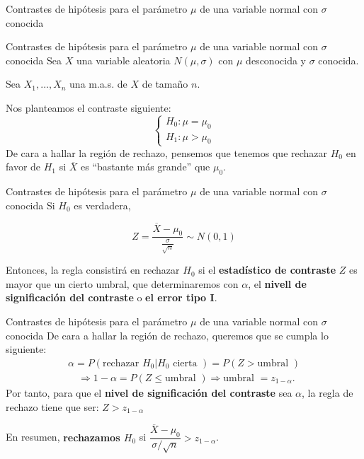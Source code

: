 \documentclass[
  ignorenonframetext,
]{beamer}
\begin{document}
\begin{frame}{Contrastes de hipótesis para el parámetro \(\mu\) de una
variable normal con \(\sigma\) conocida}
\protect\hypertarget{contrastes-de-hipuxf3tesis-para-el-paruxe1metro-mu-de-una-variable-normal-con-sigma-conocida}{}
\end{frame}

\begin{frame}{Contrastes de hipótesis para el parámetro \(\mu\) de una
variable normal con \(\sigma\) conocida}
\protect\hypertarget{contrastes-de-hipuxf3tesis-para-el-paruxe1metro-mu-de-una-variable-normal-con-sigma-conocida-1}{}
Sea \(X\) una variable aleatoria \(N(\mu,\sigma)\) con \(\mu\)
desconocida y \(\sigma\) conocida.

Sea \(X_{1},\ldots,X_{n}\) una m.a.s. de \(X\) de tamaño \(n\).

Nos planteamos el contraste siguiente: \[
\left\{\begin{array}{l}
H_{0}:\mu=\mu_{0}\\ H_{1}:\mu >\mu_0
\end{array}
\right.
\] De cara a hallar la región de rechazo, pensemos que tenemos que
rechazar \(H_0\) en favor de \(H_1\) si \(\overline{X}\) es ``bastante
más grande'' que \(\mu_0\).
\end{frame}

\begin{frame}{Contrastes de hipótesis para el parámetro \(\mu\) de una
variable normal con \(\sigma\) conocida}
\protect\hypertarget{contrastes-de-hipuxf3tesis-para-el-paruxe1metro-mu-de-una-variable-normal-con-sigma-conocida-2}{}
Si \(H_0\) es verdadera,

\[
Z=\frac{\overline{X}-\mu_{0}}{\frac{\sigma}{\sqrt{n}}}\sim N(0,1)
\]

Entonces, la regla consistirá en rechazar \(H_{0}\) si el
\textbf{estadístico de contraste} \(Z\) es mayor que un cierto umbral,
que determinaremos con \(\alpha\), el \textbf{nivell de significación
del contraste} o \textbf{el error tipo I}.
\end{frame}

\begin{frame}{Contrastes de hipótesis para el parámetro \(\mu\) de una
variable normal con \(\sigma\) conocida}
\protect\hypertarget{contrastes-de-hipuxf3tesis-para-el-paruxe1metro-mu-de-una-variable-normal-con-sigma-conocida-3}{}
De cara a hallar la región de rechazo, queremos que se cumpla lo
siguiente: \[
\begin{array}{l}
\alpha =P(\mbox{rechazar } H_{0}| H_{0} \mbox{ cierta })=P(Z>\mbox{umbral })\\
\quad \Longrightarrow 1-\alpha= P(Z\leq \mbox{umbral })\Longrightarrow \mbox{umbral }=z_{1-\alpha}.
\end{array}
\] Por tanto, para que el \textbf{nivel de significación del contraste}
sea \(\alpha\), la regla de rechazo tiene que ser: \(Z>z_{1-\alpha}\)

En resumen, \textbf{rechazamos \(H_0\)} si
\(\dfrac{\overline{X}-\mu_{0}}{\sigma/\sqrt{n}}>z_{1-\alpha}\).
\end{frame}
\end{document}
